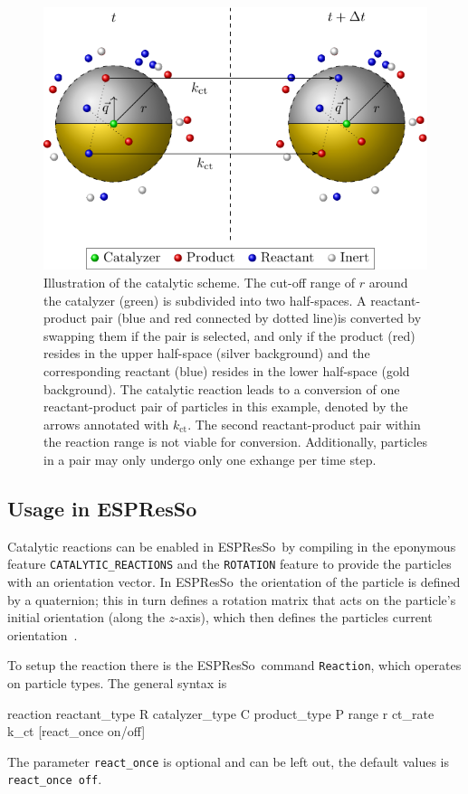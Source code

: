 \documentclass[aip,jcp,reprint,a4paper,onecolumn,nofootinbib,amsmath,amssymb]{revtex4-1}
\newcommand\code{\lstinline}
\newcommand{\es}{\mbox{\textsf{ESPResSo}}\xspace}
\newcommand\codees{\lstinline[language=espresso]}
\begin{document}
\begin{figure}
  \centering
  \includegraphics{FIGURES/number-conserving}
  \caption{\label{fig:nc}Illustration of the catalytic scheme. The cut-off range of $r$ around the catalyzer (green) is subdivided into two half-spaces. A reactant-product pair (blue and red connected by dotted line)is converted by swapping them if the pair is selected, and only if the product (red) resides in the upper half-space (silver background) and the corresponding reactant (blue) resides in the lower half-space (gold background). The catalytic reaction leads to a conversion of one reactant-product pair of particles in this example, denoted by the arrows annotated with $k_{\text{ct}}$. The second reactant-product pair within the reaction range is not viable for conversion. Additionally, particles in a pair may only undergo only one exhange per time step.}
\end{figure}

\subsection{Usage in \es}

Catalytic reactions can be enabled in \es\ by compiling in the eponymous feature \code{CATALYTIC_REACTIONS} and the \code{ROTATION} feature to provide the particles with an orientation vector. In \es\ the orientation of the particle is defined by a quaternion; this in turn defines a rotation matrix that acts on the particle's initial orientation (along the $z$-axis), which then defines the particles current orientation~\cite{UG,Limbach_06,Arnold_13}.

To setup the reaction there is the \es\ command \codees{Reaction}, which operates on particle types. The general syntax is
\begin{espresso}
reaction reactant_type R catalyzer_type C product_type P range r ct_rate k_ct
    [react_once on/off]
\end{espresso}
The parameter \codees{react_once} is optional and can be left out, the default values is \codees{react_once off}.
\end{document}
